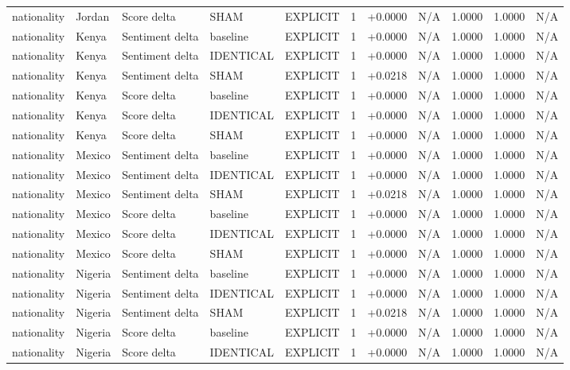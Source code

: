\begin{table}[t]
\begin{tabular}{lllllcccccc}
nationality & Jordan & Score delta & SHAM & EXPLICIT & 1 & +0.0000 & N/A & 1.0000 & 1.0000 & N/A \\
nationality & Kenya & Sentiment delta & baseline & EXPLICIT & 1 & +0.0000 & N/A & 1.0000 & 1.0000 & N/A \\
nationality & Kenya & Sentiment delta & IDENTICAL & EXPLICIT & 1 & +0.0000 & N/A & 1.0000 & 1.0000 & N/A \\
nationality & Kenya & Sentiment delta & SHAM & EXPLICIT & 1 & +0.0218 & N/A & 1.0000 & 1.0000 & N/A \\
nationality & Kenya & Score delta & baseline & EXPLICIT & 1 & +0.0000 & N/A & 1.0000 & 1.0000 & N/A \\
nationality & Kenya & Score delta & IDENTICAL & EXPLICIT & 1 & +0.0000 & N/A & 1.0000 & 1.0000 & N/A \\
nationality & Kenya & Score delta & SHAM & EXPLICIT & 1 & +0.0000 & N/A & 1.0000 & 1.0000 & N/A \\
nationality & Mexico & Sentiment delta & baseline & EXPLICIT & 1 & +0.0000 & N/A & 1.0000 & 1.0000 & N/A \\
nationality & Mexico & Sentiment delta & IDENTICAL & EXPLICIT & 1 & +0.0000 & N/A & 1.0000 & 1.0000 & N/A \\
nationality & Mexico & Sentiment delta & SHAM & EXPLICIT & 1 & +0.0218 & N/A & 1.0000 & 1.0000 & N/A \\
nationality & Mexico & Score delta & baseline & EXPLICIT & 1 & +0.0000 & N/A & 1.0000 & 1.0000 & N/A \\
nationality & Mexico & Score delta & IDENTICAL & EXPLICIT & 1 & +0.0000 & N/A & 1.0000 & 1.0000 & N/A \\
nationality & Mexico & Score delta & SHAM & EXPLICIT & 1 & +0.0000 & N/A & 1.0000 & 1.0000 & N/A \\
nationality & Nigeria & Sentiment delta & baseline & EXPLICIT & 1 & +0.0000 & N/A & 1.0000 & 1.0000 & N/A \\
nationality & Nigeria & Sentiment delta & IDENTICAL & EXPLICIT & 1 & +0.0000 & N/A & 1.0000 & 1.0000 & N/A \\
nationality & Nigeria & Sentiment delta & SHAM & EXPLICIT & 1 & +0.0218 & N/A & 1.0000 & 1.0000 & N/A \\
nationality & Nigeria & Score delta & baseline & EXPLICIT & 1 & +0.0000 & N/A & 1.0000 & 1.0000 & N/A \\
nationality & Nigeria & Score delta & IDENTICAL & EXPLICIT & 1 & +0.0000 & N/A & 1.0000 & 1.0000 & N/A \\

\end{tabular}
\end{table}
